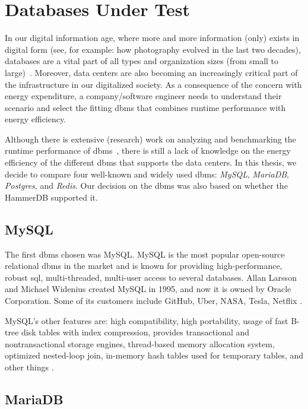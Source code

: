 \section{Databases Under Test}
\label{sc:dbtest}


In our digital information age, where more and more information (only) exists in digital form (see, for example: how photography evolved in the last two decades), databases are a vital part of all types and organization sizes (from small to large)~\cite{10.14778/2732240.2732246}. Moreover, data centers are also becoming an increasingly critical part of the infrastructure in our digitalized society. As a consequence of the concern with energy expenditure, a company/software engineer needs to understand their scenario and select the fitting \gls{dbms} that combines runtime performance with energy efficiency.

Although there is extensive (research) work on analyzing and benchmarking the runtime performance of \gls{dbms}~\cite{10.14778/1920841.1920902,seybold2019mowgli,stonebraker2010mapreduce,10.1145/2452376.2452448}, there is still a lack of knowledge on the energy efficiency of the different \gls{dbms} that supports the data centers. In this thesis, we decide to compare four well-known and widely used \gls{dbms}: \textit{MySQL}, \textit{MariaDB}, \textit{Postgres}, and \textit{Redis}. Our decision on the \gls{dbms} was also based on whether the HammerDB supported it.

\subsection{MySQL}

The first \gls{dbms} chosen was MySQL. MySQL is the most popular open-source relational \gls{dbms} in the market and is known for providing high-performance, robust \gls{sql}, multi-threaded, multi-user access to several databases. Allan Larsson and Michael Widenius created MySQL in 1995, and now it is owned by Oracle Corporation. Some of its customers include GitHub, Uber, NASA, Tesla, Netflix . 

MySQL's other features are: high compatibility, high portability, usage of fast B-tree disk tables with index compression, provides transactional and nontransactional storage engines, thread-based memory allocation system, optimized nested-loop join, in-memory hash tables used for temporary tables, and other things \cite{dubois2008mysql}.

\subsection{MariaDB}

